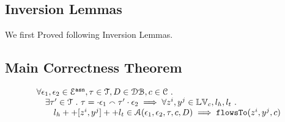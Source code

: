 \subsection{Inversion Lemmas}
We first Proved following Inversion Lemmas.

\clearpage
\subsection{Main Correctness Theorem}
\begin{thm}[Correctness]
\label{thm:alg_correct}
\[
\begin{array}{l}
  \forall \mathtt{\epsilon}_1, \mathtt{\epsilon}_2 \in \mathcal{E}^{\mathtt{{asn}}}, \mathtt{\tau} \in \mathcal{T}, D \in \mathcal{DB} , c \in \mathcal{C} ~.~
  \\ \quad 
   \exists \mathtt{\tau}' \in \mathcal{T} ~.~ \mathtt{\tau} = \cdot \mathtt{\epsilon}_1 \smallfrown \mathtt{\tau}' \cdot \mathtt{\epsilon}_2
   \implies    \forall  z^i, y^j \in \mathbb{LV}_c, l_h, l_t ~.~ 
  \\ \qquad 
   l_h ++ [z^i, y^j] ++ l_t \in \mathcal{A}(\mathtt{\epsilon}_1, \mathtt{\epsilon}_2, \mathtt{\tau}, c, D)
   \implies \mathtt{flowsTo}(z^i, y^j, c)
\end{array}
\]
\end{thm}

